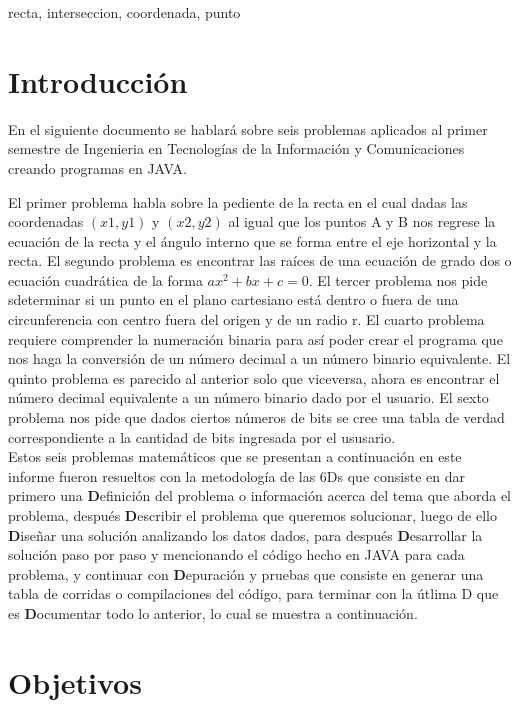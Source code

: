 \documentclass[conference]{IEEEtran}
\begin{document}
\begin{IEEEkeywords}
recta, interseccion, coordenada, punto
\end{IEEEkeywords}

\section{Introducción}
En el siguiente documento se hablará sobre seis problemas aplicados al primer semestre de Ingenieria en Tecnologías de la Información y Comunicaciones creando programas en JAVA.

El primer problema habla sobre la pediente de la recta en el cual dadas las coordenadas  $(x1,y1)$ y $(x2,y2)$ al igual que los puntos A y B nos regrese la ecuación de la recta y el ángulo interno que se forma entre el eje horizontal y la recta. El segundo problema es encontrar las raíces de una ecuación de grado dos o ecuación cuadrática de la forma $ax^2+bx+c=0$. El tercer problema nos pide sdeterminar si un punto en el plano cartesiano está dentro o fuera de una circunferencia con centro fuera del origen y de un radio r. El  cuarto problema requiere comprender la numeración binaria para así poder crear el programa que nos haga la conversión de un número decimal a un número binario equivalente. El quinto  problema es parecido al anterior solo que viceversa, ahora es encontrar el número decimal equivalente a un número binario dado por el usuario. El sexto problema nos pide que dados ciertos números de bits se cree una tabla de verdad correspondiente a la cantidad de bits ingresada por el ususario.\\

Estos seis problemas matemáticos que se presentan a continuación en este informe fueron resueltos con la metodología de las 6Ds que consiste en dar primero una \textbf{D}efinición del problema o información acerca del tema que aborda el problema, después \textbf{D}escribir el problema que queremos solucionar, luego de ello \textbf{D}iseñar una solución analizando los datos dados, para después \textbf{D}esarrollar la solución paso por paso y mencionando el código hecho en JAVA para cada problema, y continuar con \textbf{D}epuración y pruebas que consiste en generar una tabla de corridas o compilaciones del código, para terminar con la útlima D que es \textbf{D}ocumentar todo lo anterior, lo cual se muestra a continuación.

\section{Objetivos}
\end{document}

